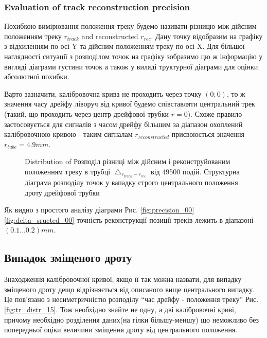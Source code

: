 \documentclass[]{article}
\begin{document}
	
	\subsubsection{Evaluation of track reconstruction precision}
	Похибкою вимірювання положення треку будемо називати різницю між дійсним положенням треку $r_{track}$ and reconstructed $r_{rec}$. Дану точку відобразим на графіку з відхиленням по осі Y та дійсним положенням треку по осі X. Для більшої наглядності ситуації з розподілом точок на графіку зобразимо цю ж інформацію у вигляді діаграми густини точок а також у виляді труктурної діаграми для  оцінки абсолютної похибки.
	
	Варто зазначити, калібровочна крива не проходить через точку $(0;0)$, то ж значення часу дрейфу ліворуч від кривої будемо співставляти центральний трек (такий, що проходить через центр дрейфової трубки $r=0$). Схоже правило застосовується для сигналів з часом дрейфу більшим за діапазон охоплений калібровочною кривою - таким сигналам $r_{reconstructed}$ присвоюється значення $r_{tube} = 4.9mm$.
	
	\begin{figure}[h]
	\centering
		\qquad
		\caption{Distribution of Розподіл різниці між дійсним і реконструйованим положенням треку в трубці $\bigtriangleup_{r_{track} - r_{rec}}$ від 49500 подій. Структурна діаграма розподілу точок у вападку строго центрального положення дроту дрейфової трубки}
	\end{figure}
	
	Як видно з простого аналізу діаграми Рис. \ref{fig:precision_00} \ref{fig:delta_sructed_00} точність реконструкції позиції треків лежить в діапазоні $(0.1 \dots 0.2) mm$. 
	
	\subsection{Випадок зміщеного дроту}
	Знаходження калібровочної кривої, якщо її так можна назвати, для випадку зміщеного дроту дещо відрізняється від описаного вище центрального випадку. Це пов’язано з несиметричністю розподілу ``час дрейфу - положення треку'' Рис. \ref{fig:tr_distr_15}. Тож необхідно знайте не одну, а дві калібровочні криві, причому необхідно розділення даних(на гілки більшу-меншу) що неможливо без попередньої оціки величини зміщення дроту від центрального положення.
	
\end{document}
